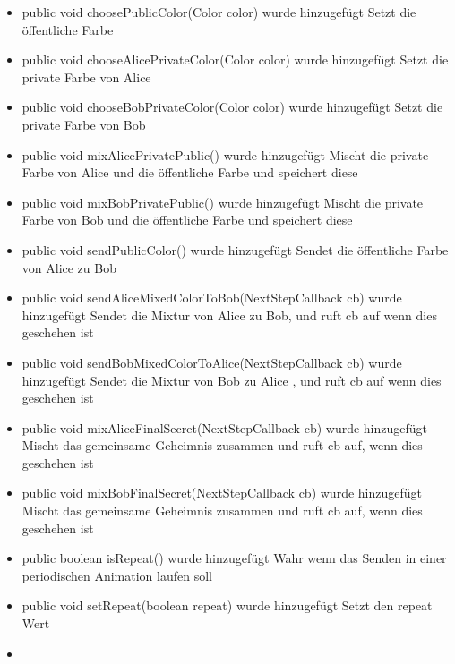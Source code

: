 \documentclass{article}
\begin{document}
\begin{itemize}
           \item public void choosePublicColor(Color color) wurde hinzugefügt\newline
               Setzt die öffentliche Farbe
           \item public void chooseAlicePrivateColor(Color color) wurde hinzugefügt\newline
               Setzt die private Farbe von Alice
           \item public void chooseBobPrivateColor(Color color) wurde hinzugefügt\newline
               Setzt die private Farbe von Bob
           \item public void mixAlicePrivatePublic() wurde hinzugefügt\newline
               Mischt die private Farbe von Alice und die öffentliche Farbe
               und speichert diese
           \item public void mixBobPrivatePublic() wurde hinzugefügt\newline
               Mischt die private Farbe von Bob und die öffentliche Farbe
               und speichert diese
           \item public void sendPublicColor() wurde hinzugefügt\newline
               Sendet die öffentliche Farbe von Alice zu Bob
           \item public void sendAliceMixedColorToBob(NextStepCallback cb) wurde hinzugefügt\newline
               Sendet die Mixtur von Alice zu Bob, und ruft cb auf wenn dies geschehen ist
           \item public void sendBobMixedColorToAlice(NextStepCallback cb) wurde hinzugefügt\newline
               Sendet die Mixtur von Bob zu Alice , und ruft cb auf wenn dies geschehen ist
           \item public void mixAliceFinalSecret(NextStepCallback cb) wurde hinzugefügt\newline
               Mischt das gemeinsame Geheimnis zusammen und ruft cb auf, wenn dies geschehen ist
           \item public void mixBobFinalSecret(NextStepCallback cb) wurde hinzugefügt\newline
               Mischt das gemeinsame Geheimnis zusammen und ruft cb auf, wenn dies geschehen ist
           \item public boolean isRepeat() wurde hinzugefügt\newline
               Wahr wenn das Senden in einer periodischen Animation laufen soll
           \item public void setRepeat(boolean repeat) wurde hinzugefügt\newline
               Setzt den repeat Wert
           \item 
           \end{itemize}
\end{document}
